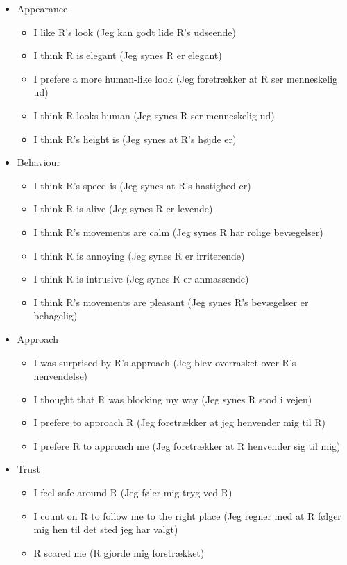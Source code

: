 \begin{itemize}
\item Appearance 
  \begin{itemize}
  \item I like R's look (Jeg kan godt lide R's udseende)
  \item I think R is elegant (Jeg synes R er elegant)
  \item I prefere a more human-like look (Jeg foretrækker at R ser menneskelig ud)
  \item I think R looks human (Jeg synes R ser menneskelig ud)
  \item I think R's height is (Jeg synes at R's højde er)
\end{itemize}
\item Behaviour
  \begin{itemize}
  \item I think R's speed is (Jeg synes at R's hastighed er)
  \item I think R is alive (Jeg synes R er levende)
  \item I think R's movements are calm (Jeg synes R har rolige bevægelser)
  \item I think R is annoying (Jeg synes R er irriterende)
  \item I think R is intrusive (Jeg synes R er anmassende)
  \item I think R's movements are pleasant (Jeg synes R's bevægelser er behagelig)
\end{itemize}
\item Approach 
\begin{itemize}
  \item I was surprised by R's approach (Jeg blev overrasket over R's henvendelse)
  \item I thought that R was blocking my way (Jeg synes R stod i vejen) 
  \item I prefere to approach R (Jeg foretrækker at jeg henvender mig til R)
  \item I prefere R to approach me (Jeg foretrækker at R henvender sig til mig) 
\end{itemize}
\item Trust
\begin{itemize}
  \item I feel safe around R (Jeg føler mig tryg ved R)
  \item I count on R to follow me to the right place (Jeg regner med at R følger mig hen til det sted jeg har valgt) 
  \item R scared me (R gjorde mig forstrækket)\\
\end{itemize}
\end{itemize}
%





